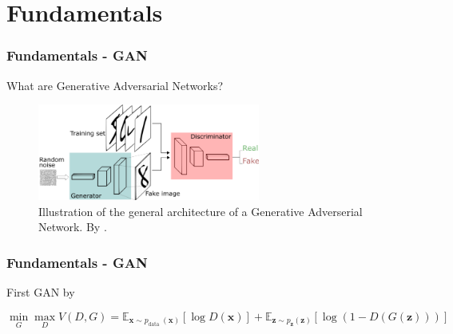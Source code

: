 \section{Fundamentals}

\begin{frame}
    \frametitle{Fundamentals - GAN}

    \begin{center}
        What are Generative Adversarial Networks?
        
        \begin{figure}[H]
            \centering
            \includegraphics[width=0.65\textwidth]{resources/images/gan.png}
            \caption{Illustration of the general architecture of a Generative Adverserial Network. By \citeauthor{twd:gan} \cite{twd:gan}.}
            \label{fig:gan}
        \end{figure}
    \end{center}
\end{frame}

\begin{frame}
    \frametitle{Fundamentals - GAN}

    \begin{center}
        First GAN by \citeauthor{goodfellow2014generative} \cite{goodfellow2014generative}
    
        \begin{equation}
            \min _{G} \max _{D} V(D, G)=\mathbb{E}_{\boldsymbol{x} \sim p_{\text {data }}(\boldsymbol{x})}[\log D(\boldsymbol{x})]+\mathbb{E}_{\boldsymbol{z} \sim p_{\boldsymbol{z}}(\boldsymbol{z})}[\log (1-D(G(\boldsymbol{z})))]
        \end{equation}
    \end{center}
\end{frame}

